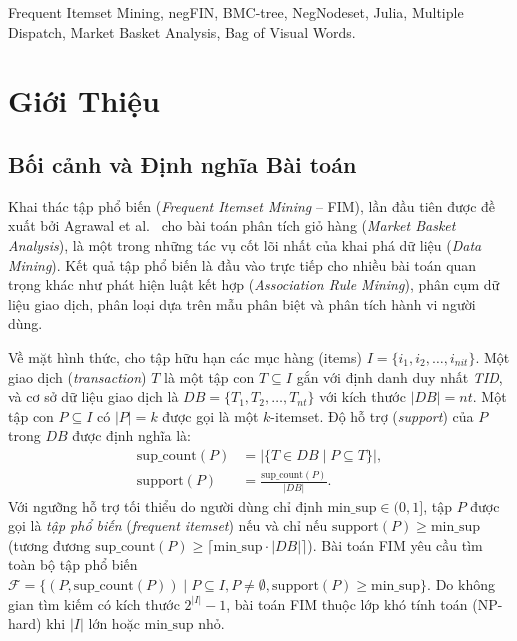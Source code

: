 \documentclass[conference]{IEEEtran}
\begin{document}
\begin{IEEEkeywords}
\mdseries
Frequent Itemset Mining, negFIN, BMC-tree, NegNodeset, Julia, Multiple Dispatch, Market Basket Analysis, Bag of Visual Words.
\end{IEEEkeywords}

\section{Giới Thiệu}

\subsection{Bối cảnh và Định nghĩa Bài toán}
Khai thác tập phổ biến (\textit{Frequent Itemset Mining} -- FIM), lần đầu tiên được đề xuất bởi Agrawal et al.~\cite{b1} cho bài toán phân tích giỏ hàng (\textit{Market Basket Analysis}), là một trong những tác vụ cốt lõi nhất của khai phá dữ liệu (\textit{Data Mining}). Kết quả tập phổ biến là đầu vào trực tiếp cho nhiều bài toán quan trọng khác như phát hiện luật kết hợp (\textit{Association Rule Mining}), phân cụm dữ liệu giao dịch, phân loại dựa trên mẫu phân biệt và phân tích hành vi người dùng.

Về mặt hình thức, cho tập hữu hạn các mục hàng (items) $I = \{i_1, i_2, \dots, i_{nit}\}$. Một giao dịch (\textit{transaction}) $T$ là một tập con $T \subseteq I$ gắn với định danh duy nhất \textit{TID}, và cơ sở dữ liệu giao dịch là $DB = \{T_1, T_2, \dots, T_{nt}\}$ với kích thước $|DB| = nt$. Một tập con $P \subseteq I$ có $|P| = k$ được gọi là một $k$-itemset. Độ hỗ trợ (\textit{support}) của $P$ trong $DB$ được định nghĩa là:
\begin{align}
\text{sup\_count}(P) &= |\{T \in DB \mid P \subseteq T\}|, \nonumber \\
\text{support}(P) &= \frac{\text{sup\_count}(P)}{|DB|}.
\label{eq:support}
\end{align}
Với ngưỡng hỗ trợ tối thiểu do người dùng chỉ định $\text{min\_sup} \in (0, 1]$, tập $P$ được gọi là \textit{tập phổ biến} (\textit{frequent itemset}) nếu và chỉ nếu $\text{support}(P) \ge \text{min\_sup}$ (tương đương $\text{sup\_count}(P) \ge \lceil \text{min\_sup} \cdot |DB| \rceil$). Bài toán FIM yêu cầu tìm toàn bộ tập phổ biến $\mathcal{F} = \{(P, \text{sup\_count}(P)) \mid P \subseteq I, P \neq \emptyset, \text{support}(P) \ge \text{min\_sup}\}$. Do không gian tìm kiếm có kích thước $2^{|I|} - 1$, bài toán FIM thuộc lớp khó tính toán (NP-hard) khi $|I|$ lớn hoặc $\text{min\_sup}$ nhỏ.
\end{document}
